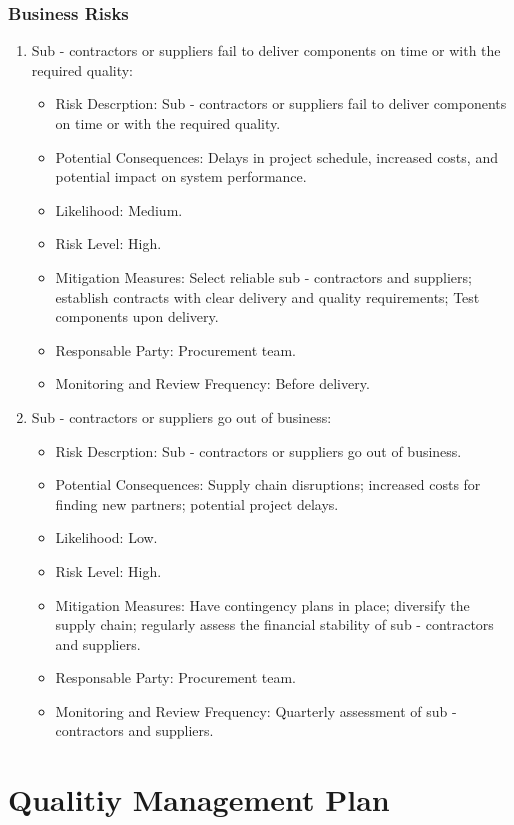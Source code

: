 \documentclass{article}
\begin{document}
\subsubsection{Business Risks}
\begin{enumerate}
    \item Sub - contractors or suppliers fail to deliver components on time or with the required quality:
    \begin{itemize}
        \item Risk Descrption: Sub - contractors or suppliers fail to deliver components on time or with the required quality.
        \item Potential Consequences: Delays in project schedule, increased costs, and potential impact on system performance.
        \item Likelihood: Medium.
        \item Risk Level: High.
        \item Mitigation Measures: Select reliable sub - contractors and suppliers; establish contracts with clear delivery and quality requirements; Test components upon delivery.
        \item Responsable Party: Procurement team.
        \item Monitoring and Review Frequency: Before delivery.
    \end{itemize}
    \item Sub - contractors or suppliers go out of business:
    \begin{itemize}
        \item Risk Descrption: Sub - contractors or suppliers go out of business.
        \item Potential Consequences: Supply chain disruptions; increased costs for finding new partners; potential project delays.
        \item Likelihood: Low.
        \item Risk Level: High.
        \item Mitigation Measures: Have contingency plans in place; diversify the supply chain; regularly assess the financial stability of sub - contractors and suppliers.
        \item Responsable Party: Procurement team.
        \item Monitoring and Review Frequency: Quarterly assessment of sub - contractors and suppliers.
    \end{itemize}
\end{enumerate}
\clearpage
\section{Qualitiy Management Plan}
\end{document}
